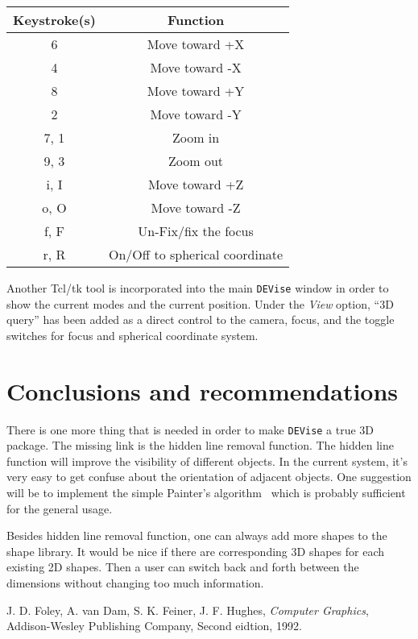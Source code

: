 \begin{center}
\begin{tabular}{|c|c|} \hline
  Keystroke(s) & Function \\ \hline \hline
  6 & Move toward +X \\ \hline
  4 & Move toward -X \\ \hline

  8 & Move toward +Y \\ \hline
  2 & Move toward -Y \\ \hline

  7, 1 & Zoom in \\ \hline
  9, 3 & Zoom out \\ \hline

  i, I & Move toward +Z \\ \hline
  o, O & Move toward -Z \\ \hline

  f, F & Un-Fix/fix the focus \\ \hline
  r, R & On/Off to spherical coordinate \\ \hline
\end{tabular}
\end{center}

Another Tcl/tk tool is incorporated into the main {\tt DEVise} 
window in order
to show the current modes and the current position.  Under the {\em
View} option, ``3D query'' has been added as a direct control to the camera,
focus, and the toggle switches for focus and spherical coordinate
system.

\section{Conclusions and recommendations}

There is one more thing that is needed  in order to make {\tt DEVise} 
a true 3D package.  The missing link is the hidden line removal
function.  The hidden line function will improve the visibility of
different objects.   In the current system, it's very easy to get confuse
about the orientation of adjacent objects.  One suggestion will be to
implement the simple Painter's algorithm~\cite{FDFH92} which is 
probably sufficient for the general usage.

Besides hidden line removal function, one can always add more 
shapes to the shape library.  It would be nice if there are
corresponding 3D shapes for each existing 2D shapes.  Then a user 
can switch back and forth between the dimensions without changing too
much information.

\begin{thebibliography}{99}

  J. D. Foley, A. van Dam, S. K. Feiner, J. F. 
  Hughes, {\em Computer Graphics}, Addison-Wesley Publishing 
  Company, Second eidtion, 1992.
\end{thebibliography}



